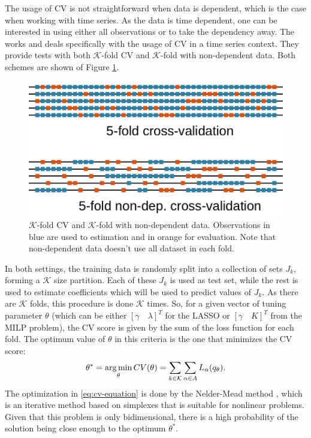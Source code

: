 The usage of CV is not straightforward when data is dependent, which is the case when working with time series. As the data is time dependent, one can be interested in using either all observations or to take the dependency away. The works
\cite{bergmeir_note_2017} and \cite{bergmeir_use_2012} deals specifically with the usage of CV in a time series context. They provide tests with both $\mathcal{K}$-fold CV and $\mathcal{K}$-fold with non-dependent data. Both schemes are shown of Figure \ref{fig:cross-validation-scheme}.
\begin{figure}
	\centering
	\includegraphics[width=0.9\linewidth]{../Figuras/Cross-validation-scheme}
	\caption{$\mathcal{K}$-fold CV and $\mathcal{K}$-fold with non-dependent data. Observations in blue are used to estimation and in orange for evaluation. Note that non-dependent data doesn't use all dataset in each fold.}
	\label{fig:cross-validation-scheme}
\end{figure}
In both settings, the training data is randomly split into a collection of sets $J_k$, forming a $\mathcal{K}$ size partition. Each of these $J_k$ is used as test set, while the rest is used to estimate coefficients which will be used to predict values of $J_k$. As there are $\mathcal{K}$ folds, this procedure is done $\mathcal{K}$ times. So, for a given vector of tuning parameter $\theta$ (which can be either $[\gamma \quad \lambda]^T$ for the LASSO or $[\gamma \quad K]^T$ from the MILP problem), the CV score is given by the sum of the loss function for each fold. The optimum value of $\theta$ in this criteria is the one that minimizes the CV score:
\[
\theta^* = \argmin_\theta CV(\theta) = \sum_{k \in \mathcal{K}} \sum_{\alpha \in A} L_\alpha(q_\theta).\label{eq:cv-equation}
\]
The optimization in \ref{eq:cv-equation} is done by the Nelder-Mead method%
, which is an iterative method based on simplexes that is suitable for nonlinear problems. Given that this problem is only bidimensional, there is a high probability of the solution being close enough to the optimum $\theta^*$.



